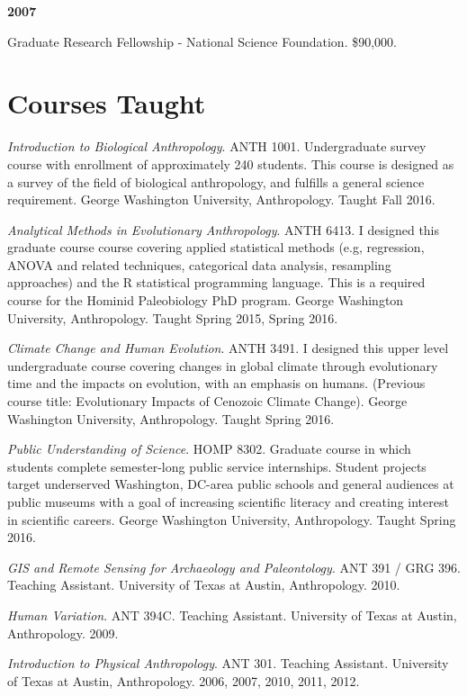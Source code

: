 \documentclass{article}
\begin{document}
\begin{description*}
\item[] {\bfseries 2007}
\item[] Graduate Research Fellowship - National Science Foundation. \$90,000.
\end{description*}

\section*{Courses Taught}
\begin{description*}

\item[]\emph{Introduction to Biological Anthropology}. ANTH 1001. Undergraduate survey course with enrollment of approximately 240 students. This course is designed as a survey of the field of biological anthropology, and fulfills a general science requirement. George Washington University, Anthropology. Taught Fall 2016.

\item[] \emph{Analytical Methods in Evolutionary Anthropology}. ANTH 6413. I designed this graduate course course covering applied statistical methods (e.g, regression, ANOVA and related techniques, categorical data analysis, resampling approaches) and the R statistical programming language. This is a required course for the Hominid Paleobiology PhD program. George Washington University, Anthropology. Taught Spring 2015, Spring 2016.

\item[] \emph{Climate Change and Human Evolution}. ANTH 3491. I designed this upper level undergraduate course covering changes in global climate through evolutionary time and the impacts on evolution, with an emphasis on humans. (Previous course title: Evolutionary Impacts of Cenozoic Climate Change). George Washington University, Anthropology. Taught Spring 2016.

\item[] \emph{Public Understanding of Science}. HOMP 8302.  Graduate course in which students complete semester-long public service internships. Student projects target underserved Washington, DC-area public schools and general audiences at public museums with a goal of increasing scientific literacy and creating interest in scientific careers. George Washington University, Anthropology. Taught Spring 2016.

\item[] \emph{GIS and Remote Sensing for Archaeology and Paleontology}. ANT 391 / GRG 396. Teaching Assistant.  University of Texas at Austin, Anthropology. 2010.

\item[] \emph{Human Variation}. ANT 394C. Teaching Assistant. University of Texas at Austin, Anthropology. 2009.

\item[] \emph{Introduction to Physical Anthropology}. ANT 301. Teaching Assistant. University of Texas at Austin, Anthropology. 2006, 2007, 2010, 2011, 2012.
\end{description*}
\end{document}
